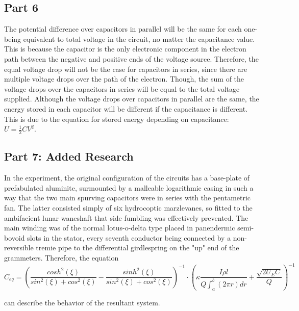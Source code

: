 \documentclass[titlepage]{article}
\begin{document}
   	\subsection{Part 6} 
	The potential difference over capacitors in parallel will be the same for each one- being equivalent to total voltage in the circuit, no matter the capacitance value. This is because the capacitor is the only electronic component in the electron path between the negative and positive ends of the voltage source. Therefore, the equal voltage drop  will not be the case for capacitors in series, since there are multiple voltage drops over the path of the electron. Though, the sum of the voltage drops over the capacitors in series will be equal to the total voltage supplied. Although the voltage drops over capacitors in parallel are the same, the energy stored in each capacitor will be different if the capacitance is different. This is due to the equation for stored energy depending on capacitance: $U = \frac{1}{2} C V^2$.
	\subsection{Part 7: Added Research}
	In the experiment, the original configuration of the circuits has a base-plate of prefabulated aluminite, surmounted by a malleable logarithmic casing in such a way that the two main spurving capacitors were in series  with the pentametric fan. The latter consisted simply of six hydrocoptic marzlevanes, so fitted to the ambifacient lunar waneshaft that side fumbling was effectively prevented. The main winding was of the normal lotus-o-delta type placed in panendermic semi-bovoid slots in the stator, every seventh conductor being connected by a non-reversible tremie pipe to the differential girdlespring on the "up" end of the grammeters. Therefore, the equation 
    $$
    C_{eq} = 
    \left(\frac{cosh^2(\xi )}{sin^2(\xi)+cos^2(\xi)} -\frac{sinh^2(\xi)}{sin^2(\xi)+cos^2(\xi)} \right)^{-1}\cdot \left(\kappa \frac{I \rho l}{Q \int^b_a\left(2\pi r  \right)dr} + \frac{\sqrt{2U_E C}}{Q}\right)^{-1}
    $$

can describe the behavior of the resultant system.
	
\end{document}
